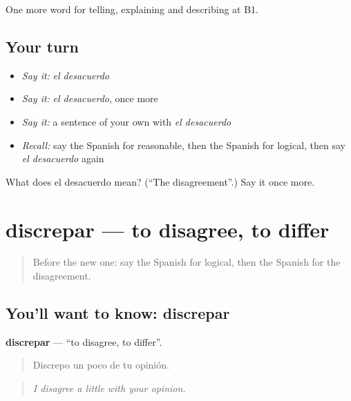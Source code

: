\begin{grammarlens}[title={What you've built}]
One more word for telling, explaining and describing at B1.
\end{grammarlens}

\subsection*{Your turn}
\begin{itemize}
\raggedright
  \item \emph{Say it:} \emph{el desacuerdo}
  \item \emph{Say it:} \emph{el desacuerdo}, once more
  \item \emph{Say it:} a sentence of your own with \emph{el desacuerdo}
  \item \emph{Recall:} say the Spanish for reasonable, then the Spanish for logical, then say \emph{el desacuerdo} again
\end{itemize}

\begin{tcolorbox}[breakable,colback=teal!4,colframe=teal!35!black,title={Before you move on}]
What does el desacuerdo mean? (\textquotedblleft{}The disagreement\textquotedblright{}.) Say it once more.
\end{tcolorbox}
\section[discrepar]{discrepar — to disagree, to differ}

\label{lesson:ES-C578-discrepar}



\begin{quote}
Before the new one: say the Spanish for logical, then the Spanish for the disagreement.
\end{quote}

\subsection*{You'll want to know: discrepar}
\textbf{discrepar} — \textquotedblleft{}to disagree, to differ\textquotedblright{}.

\begin{quote}
Discrepo un poco de tu opinión.
\end{quote}

\begin{quote}
\emph{I disagree a little with your opinion.}
\end{quote}

